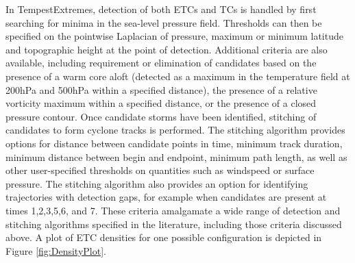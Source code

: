 \documentclass[11pt]{article}
\newcommand\citep{\cite}
\begin{document}
In TempestExtremes, detection of both ETCs and TCs is handled by first searching for minima in the sea-level pressure field.  Thresholds can then be specified on the pointwise Laplacian of pressure, maximum or minimum latitude and topographic height at the point of detection.  Additional criteria are also available, including requirement or elimination of candidates based on the presence of a warm core aloft (detected as a maximum in the temperature field at 200hPa and 500hPa within a specified distance), the presence of a relative vorticity maximum within a specified distance, or the presence of a closed pressure contour.  Once candidate storms have been identified, stitching of candidates to form cyclone tracks is performed.  The stitching algorithm provides options for distance between candidate points in time, minimum track duration, minimum distance between begin and endpoint, minimum path length, as well as other user-specified thresholds on quantities such as windspeed or surface pressure.  The stitching algorithm also provides an option for identifying trajectories with detection gaps, for example when candidates are present at times 1,2,3,5,6, and 7.  These criteria amalgamate a wide range of detection and stitching algorithms specified in the literature, including those criteria discussed above.  A plot of ETC densities for one possible configuration is depicted in Figure \ref{fig:DensityPlot}.


\end{document}
